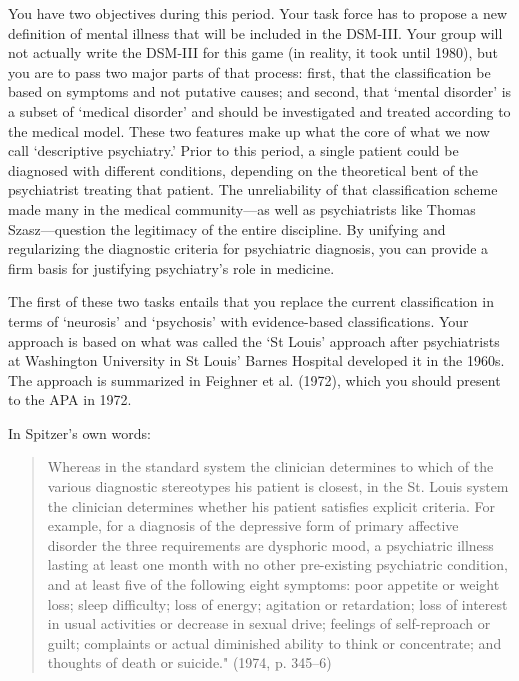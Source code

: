 You have two objectives during this period. Your task force has to propose a new definition of mental illness that will be included in the DSM-III. Your group will not actually write the DSM-III for this game (in reality, it took until 1980), but you are to pass two major parts of that process: first, that the classification be based on symptoms and not putative causes; and second, that `mental disorder' is a subset of `medical disorder' and should be investigated and treated according to the medical model. These two features make up what the core of what we now call `descriptive psychiatry.' Prior to this period, a single patient could be diagnosed with different conditions, depending on the theoretical bent of the psychiatrist treating that patient. The unreliability of that classification scheme made many in the medical community---as well as psychiatrists like Thomas Szasz---question the legitimacy of the entire discipline. By unifying and regularizing the diagnostic criteria for psychiatric diagnosis, you can provide a firm basis for justifying psychiatry's role in medicine.

The first of these two tasks entails that you replace the current classification in terms of `neurosis' and `psychosis' with evidence-based classifications. Your approach is based on what was called the `St Louis' approach after psychiatrists at Washington University in St Louis' Barnes Hospital developed it in the 1960s. The approach is summarized in Feighner et al. (1972), which you should present to the APA in 1972.

In Spitzer's own words:

\begin{quote}

Whereas in the standard system the clinician determines to which of the various diagnostic stereotypes his patient is closest, in the St. Louis system the clinician determines whether his patient satisfies explicit criteria. For example, for a diagnosis of the depressive form of primary affective disorder the three requirements are dysphoric mood, a psychiatric illness lasting at least one month with no other pre-existing psychiatric condition, and at least five of the following eight symptoms: poor appetite or weight loss; sleep difficulty; loss of energy; agitation or retardation; loss of interest in usual activities or decrease in sexual drive; feelings of self-reproach or guilt; complaints or actual diminished ability to think or concentrate; and thoughts of death or suicide." (1974, p. 345--6)
\end{quote}

